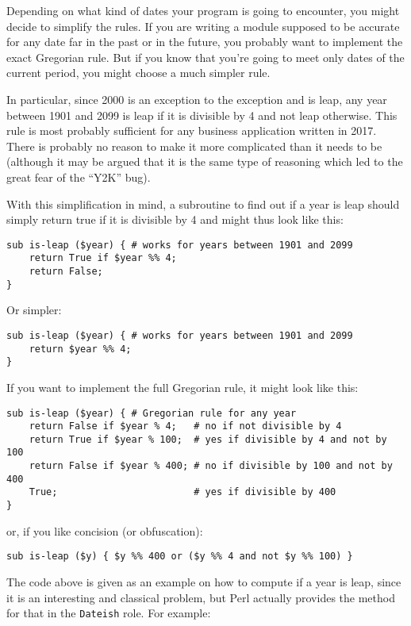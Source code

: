 Depending on what kind of dates your program is going to 
encounter, you might decide to simplify the rules. If 
you are writing a module supposed to be accurate for any 
date far in the past or in the future, you probably want 
to implement the exact Gregorian rule. But if you know 
that you're going to meet only dates of the current 
period, you might choose a much simpler rule.

In particular, since 2000 is an exception to the exception 
and is leap, any year between 1901 and 2099 is leap if it 
is divisible by 4 and not leap otherwise. This rule is 
most probably sufficient for any business application 
written in 2017. There is probably no reason to make it 
more complicated than it needs to be (although it may be 
argued that it is the same type of reasoning which led to 
the great fear of the ``Y2K'' bug). 

With this simplification in mind, a subroutine to find out 
if a year is leap should simply return true if it is 
divisible by 4 and might thus look like this:

\begin{verbatim}
sub is-leap ($year) { # works for years between 1901 and 2099
    return True if $year %% 4; 
    return False;
}
\end{verbatim}

Or simpler:

\begin{verbatim}
sub is-leap ($year) { # works for years between 1901 and 2099
    return $year %% 4; 
}
\end{verbatim}

If you want to implement the full Gregorian rule, it might 
look like this:

\begin{verbatim}
sub is-leap ($year) { # Gregorian rule for any year
    return False if $year % 4;   # no if not divisible by 4
    return True if $year % 100;  # yes if divisible by 4 and not by 100
    return False if $year % 400; # no if divisible by 100 and not by 400
    True;                        # yes if divisible by 400
}
\end{verbatim}

or, if you like concision (or obfuscation):
\begin{verbatim}
sub is-leap ($y) { $y %% 400 or ($y %% 4 and not $y %% 100) }
\end{verbatim}

The code above is given as an example on how to compute 
if a year is leap, since it is an interesting and 
classical problem, but Perl actually provides the method for that 
in the {\tt Dateish} role. For example:

